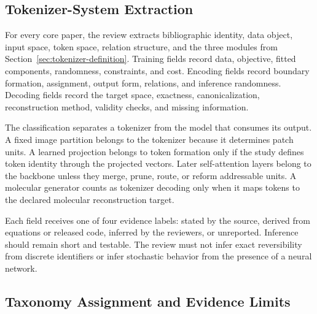 \subsection{Tokenizer-System Extraction}


For every core paper, the review extracts bibliographic identity, data object, input space, token space, relation structure, and the three modules from Section~\ref{sec:tokenizer-definition}. Training fields record data, objective, fitted components, randomness, constraints, and cost. Encoding fields record boundary formation, assignment, output form, relations, and inference randomness. Decoding fields record the target space, exactness, canonicalization, reconstruction method, validity checks, and missing information.

The classification separates a tokenizer from the model that consumes its output. A fixed image partition belongs to the tokenizer because it determines patch units. A learned projection belongs to token formation only if the study defines token identity through the projected vectors. Later self-attention layers belong to the backbone unless they merge, prune, route, or reform addressable units. A molecular generator counts as tokenizer decoding only when it maps tokens to the declared molecular reconstruction target.

Each field receives one of four evidence labels: stated by the source, derived from equations or released code, inferred by the reviewers, or unreported. Inference should remain short and testable. The review must not infer exact reversibility from discrete identifiers or infer stochastic behavior from the presence of a neural network.

\subsection{Taxonomy Assignment and Evidence Limits}


